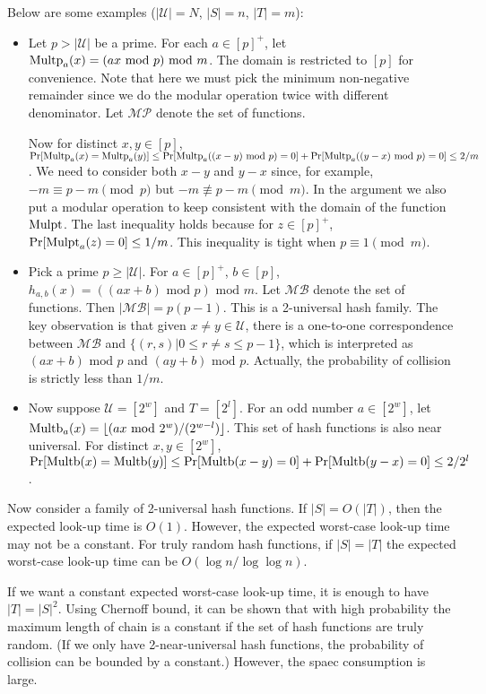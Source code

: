 \documentclass[openany]{book}
\begin{document}
Below are some examples ($|\mathcal{U}|=N$, $|S|=n$, $|T|=m$):
\begin{itemize}
\item Let $p>|\mathcal{U}|$ be a prime. For each $a\in[p]^+$, let $\mathrm{Multp}_a(x)=(ax\textrm{ mod }p)\textrm{ mod }m$. The domain is restricted to $[p]$ for convenience. Note that here we must pick the minimum non-negative remainder since we do the modular operation twice with different denominator. Let $\mathcal{MP}$ denote the set of functions.

Now for distinct $x,y\in[p]$, $\mathrm{Pr}[\mathrm{Multp}_a(x)=\mathrm{Multp}_a(y)]\le\mathrm{Pr}[\mathrm{Multp}_a((x-y)\textrm{ mod }p)=0]+\mathrm{Pr}[\mathrm{Multp}_a((y-x)\textrm{ mod }p)=0]\le2/m$. We need to consider both $x-y$ and $y-x$ since, for example, $-m\equiv p-m\pmod{p}$ but $-m\not\equiv p-m\pmod{m}$. In the argument we also put a modular operation to keep consistent with the domain of the function $\mathrm{Mulpt}$. The last inequality holds because for $z\in[p]^+$, $\mathrm{Pr}[\mathrm{Mulpt}_a(z)=0]\le1/m$. This inequality is tight when $p\equiv1\pmod{m}$.

\item Pick a prime $p\ge|\mathcal{U}|$. For $a\in[p]^+$, $b\in[p]$, $h_{a,b}(x)=((ax+b)\textrm{ mod }p)\textrm{ mod }m$. Let $\mathcal{MB}$ denote the set of functions. Then $|\mathcal{MB}|=p(p-1)$. This is a 2-universal hash family. The key observation is that given $x\ne y\in \mathcal{U}$, there is a one-to-one correspondence between $\mathcal{MB}$ and $\{(r,s)|0\le r\ne s\le p-1\}$, which is interpreted as $(ax+b)\textrm{ mod }p$ and $(ay+b)\textrm{ mod }p$. Actually, the probability of collision is strictly less than $1/m$.

\item Now suppose $\mathcal{U}=[2^w]$ and $T=[2^l]$. For an odd number $a\in[2^w]$, let $\mathrm{Multb}_a(x)=\lfloor(ax\textrm{ mod }2^w)/(2^{w-l})\rfloor$. This set of hash functions is also near universal. For distinct $x,y\in[2^w]$, $\mathrm{Pr}[\mathrm{Multb}(x)=\mathrm{Multb}(y)]\le\mathrm{Pr}[\mathrm{Multb}(x-y)=0]+\mathrm{Pr}[\mathrm{Multb}(y-x)=0]\le2/2^l$.
\end{itemize}

Now consider a family of 2-universal hash functions. If $|S|=O(|T|)$, then the expected look-up time is $O(1)$. However, the expected worst-case look-up time may not be a constant. For truly random hash functions, if $|S|=|T|$ the expected worst-case look-up time can be $O(\log n/\log\log n)$.

If we want a constant expected worst-case look-up time, it is enough to have $|T|=|S|^2$. Using Chernoff bound, it can be shown that with high probability the maximum length of chain is a constant if the set of hash functions are truly random. (If we only have 2-near-universal hash functions, the probability of collision can be bounded by a constant.) However, the spaec consumption is large.
\end{document}
